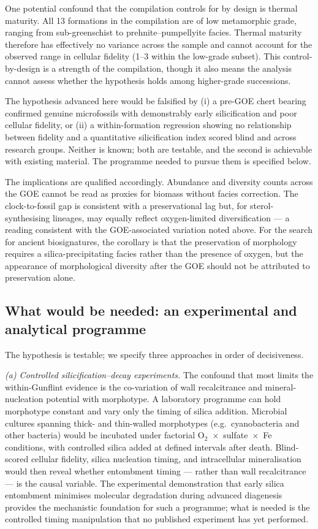 \documentclass[11pt]{article}
\begin{document}
One potential confound that the compilation controls for by design is thermal maturity. All 13
formations in the compilation are of low metamorphic grade, ranging from sub-greenschist to
prehnite--pumpellyite facies. Thermal maturity therefore has effectively no variance across the
sample and cannot account for the observed range in cellular fidelity (1--3 within the low-grade
subset). This control-by-design is a strength of the compilation, though it also means the analysis
cannot assess whether the hypothesis holds among higher-grade successions.

The hypothesis advanced here would be falsified by (i) a pre-GOE chert bearing confirmed genuine
microfossils with demonstrably early silicification and poor cellular fidelity, or (ii) a
within-formation regression showing no relationship between fidelity and a quantitative
silicification index scored blind and across research groups. Neither is known; both are testable,
and the second is achievable with existing material. The programme needed to pursue them is
specified below.

The implications are qualified accordingly. Abundance and diversity counts across the GOE cannot be
read as proxies for biomass without facies correction. The clock-to-fossil gap is consistent with a
preservational lag but, for sterol-synthesising lineages, may equally reflect oxygen-limited
diversification --- a reading consistent with the GOE-associated variation noted above. For the
search for ancient biosignatures, the corollary is
that the preservation of morphology requires a silica-precipitating facies rather than the presence
of oxygen, but the appearance of morphological diversity after the GOE should not be attributed to
preservation alone.

\subsection{What would be needed: an experimental and analytical programme}

The hypothesis is testable; we specify three approaches in order of decisiveness.

\textit{(a) Controlled silicification--decay experiments.} The confound that most limits the
within-Gunflint evidence is the co-variation of wall recalcitrance and mineral-nucleation potential
with morphotype. A laboratory programme can hold morphotype constant and vary only the timing of
silica addition. Microbial cultures spanning thick- and thin-walled morphotypes (e.g.\ cyanobacteria
and other bacteria) would be incubated under factorial O$_2$~$\times$~sulfate~$\times$~Fe conditions,
with controlled silica added at defined intervals after death. Blind-scored cellular fidelity, silica
nucleation timing, and intracellular mineralisation would then reveal whether entombment timing ---
rather than wall recalcitrance --- is the causal variable. The experimental demonstration that early
silica entombment minimises molecular degradation during advanced diagenesis \citep{Alleon2016b}
provides the mechanistic foundation for such a programme; what is needed is the controlled timing
manipulation that no published experiment has yet performed.
\end{document}
